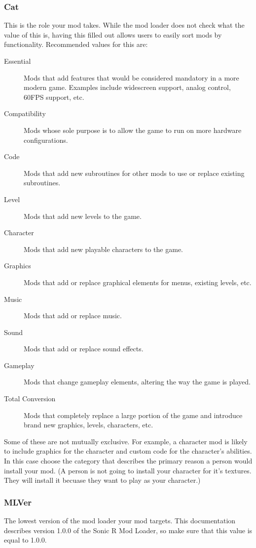 \documentclass[12pt,a4paper,notitlepage]{article}
\begin{document}
\subsubsection{Cat}
\label{subsubsec:create-meta-cat}
This is the role your mod takes. While the mod loader does not check what the value of this is, having this filled out allows users to easily sort mods by functionality. Recommended values for this are:

\begin{description}
\item[Essential] Mods that add features that would be considered mandatory in a more modern game. Examples include widescreen support, analog control, 60FPS support, etc. 
\item[Compatibility] Mods whose sole purpose is to allow the game to run on more hardware configurations.
\item[Code] Mods that add new subroutines for other mods to use or replace existing subroutines.
\item[Level] Mods that add new levels to the game.
\item[Character] Mods that add new playable characters to the game.
\item[Graphics] Mods that add or replace graphical elements for menus, existing levels, etc.
\item[Music] Mods that add or replace music.
\item[Sound] Mods that add or replace sound effects.
\item[Gameplay] Mods that change gameplay elements, altering the way the game is played.
\item[Total Conversion] Mods that completely replace a large portion of the game and introduce brand new graphics, levels, characters, etc.

\end{description}
Some of these are not mutually exclusive. For example, a character mod is likely to include graphics for the character and custom code for the character's abilities. In this case choose the category that describes the primary reason a person would install your mod. (A person is not going to install your character for it's textures. They will install it becuase they want to play as your character.)

\subsubsection{MLVer}
\label{subsubsec:create-meta-mlver}
The lowest version of the mod loader your mod targets. This documentation describes version 1.0.0 of the Sonic R Mod Loader, so make sure that this value is equal to 1.0.0.
\end{document}
